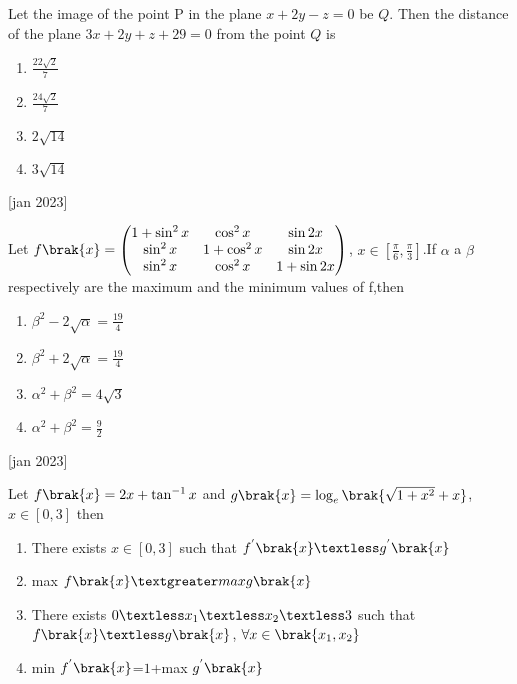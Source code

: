 \iffalse
\title{Assignment 3}
\author{AI24BTECH11018}
\section{mcq-single}
\fi

\item Let the image of the point P in the plane $x+2y-z=0$ be $Q$. Then the distance of the plane 
$3x + 2y + z + 29 = 0$ from the point $Q$ is
\begin{enumerate}
    \item $\frac{22\sqrt{2}}{7}$
    \item $\frac{24\sqrt{2}}{7}$
    \item $2\sqrt{14}$
    \item $3\sqrt{14}$
\end{enumerate}
\hfill{[jan 2023]}
\item Let $f\brak{x}=\begin{pmatrix}
1+\sin^2{x} & \cos^2{x} & \sin 2x \\
\sin^2{x} & 1+\cos^2{x} & \sin 2x \\
\sin^2{x} & \cos^2{x} & 1+\sin 2x
\end{pmatrix}$, $x\in [\frac{\pi}{6},\frac{\pi}{3}]$.If $\alpha$ a $\beta$ respectively are the maximum and the minimum values of f,then
\begin{enumerate}
    \item $\beta^2-2\sqrt{\alpha}=\frac{19}{4}$
    \item $\beta^2+2\sqrt{\alpha}=\frac{19}{4}$
    \item $\alpha^2 + \beta^2 = 4\sqrt{3}$
    \item $\alpha^2 + \beta^2 = \frac{9}{2}$
\end{enumerate}
\hfill{[jan 2023]}
\item Let $f\brak{x}=2x+\tan^{-1}x$ and $g\brak{x}=\log_{e}\brak{\sqrt{1+x^2}+x}$, $x\in [0,3]$ then 
\begin{enumerate}
    \item There exists $x\in [0,3]$ such that $f^{'}\brak{x} \textless g^{'}\brak{x}$
    \item max $f\brak{x} \textgreater max g\brak{x}$
    \item There exists $0 \textless x_1 \textless x_2\textless 3$ such that $f\brak{x} \textless g\brak{x}$, $\forall x\in \brak{x_1,x_2}$
    \item min $f^{'}\brak{x}$=$1$+max $ g^{'}\brak{x}$
\end{enumerate}
